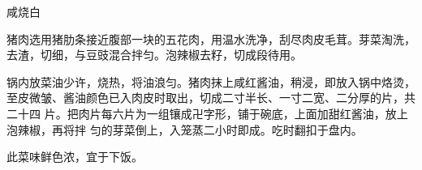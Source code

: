 %
%
%
%
%
%
%
\begin{recipe}{咸烧白}

\ingredients


\preparation

\step 猪肉选用猪肋条接近腹部一块的五花肉，用温水洗净，刮尽肉皮毛茸。芽菜淘洗，
去渣，切细，与豆豉混合拌匀。泡辣椒去籽，切成段待用。

\step 锅内放菜油少许，烧热，将油浪匀。猪肉抹上咸红酱油，稍浸，即放入锅中烙烫，
至皮微皱、酱油颜色已入肉皮时取出，切成二寸半长、一寸二宽、二分厚的片，共二十四
片。把肉片每六片为一组镶成卍字形，铺于碗底，上面加甜红酱油，放上泡辣椒，再将拌
匀的芽菜倒上，入笼蒸二小时即成。吃时翻扣于盘内。

\features

此菜味鲜色浓，宜于下饭。

\end{recipe}

